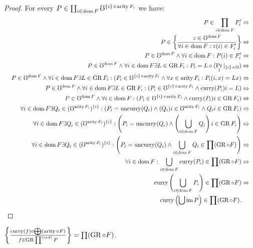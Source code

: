 \begin{proof}
For every $P\in\coprod_{i\in\operatorname{dom} F}\mho^{\{i\}\times\operatorname{arity} F_{i}}$
we have:
\[
\resizebox{\hsize}{!}{
$\begin{aligned}
P\in\prod_{i\in\dom F}F'_{i} & \Leftrightarrow\\
P\in\setcond{z\in\mho^{\dom F}}{\forall i\in\dom F:z(i)\in F'_{i}} & \Leftrightarrow\\
P\in\mho^{\dom F}\land\forall i\in\dom F:P(i)\in F'_{i} & \Leftrightarrow\\
P\in\mho^{\dom F}\land\forall i\in\dom F\exists L\in\GR F_{i}:P_{i}=L\circ(\Pr_{1}|_{\{i\}\times\mho}) & \Leftrightarrow\\
P\in\mho^{\dom F}\land\forall i\in\dom F\exists L\in\GR F_{i}:(P_{i}\in\mho^{\{i\}\times\arity F_{i}}\land\forall x\in\arity F_{i}:P_{i}(i,x)=Lx) & \Leftrightarrow\\
P\in\mho^{\dom F}\land\forall i\in\dom F\exists L\in\GR F_{i}:(P_{i}\in\mho^{\{i\}\times\arity F_{i}}\land\curry(P_{i})i=L) & \Leftrightarrow\\
P\in\mho^{\dom F}\land\forall i\in\dom F:(P_{i}\in\mho^{\{i\}\times\arity F_{i}}\land\curry(P_{i})i\in\GR F_{i}) & \Leftrightarrow\\
\forall i\in\dom F\exists Q_{i}\in(\mho^{\arity F_{i}})^{\{i\}}:(P_{i}=\uncurry(Q_{i})\land(Q_{i})i\in\mho^{\arity F_{i}}\land Q_{i}i\in\GR F_{i}) & \Leftrightarrow\\
\forall i\in\dom F\exists Q_{i}\in(\mho^{\arity F_{i}})^{\{i\}}:\left(P_{i}=\uncurry(Q_{i})\land\left(\bigcup_{i\in\dom F}Q_{i}\right)i\in\GR F_{i}\right) & \Leftrightarrow\\
\forall i\in\dom F\exists Q_{i}\in(\mho^{\arity F_{i}})^{\{i\}}:\left(P_{i}=\uncurry(Q_{i})\land\bigcup_{i\in\dom F}Q_{i}\in\prod(\GR\circ F)\right) & \Leftrightarrow\\
\forall i\in\dom F:\bigcup_{i\in\dom F}\curry(P_{i})\in\prod(\GR\circ F) & \Leftrightarrow\\
\curry\left(\bigcup_{i\in\dom F}P_{i}\right)\in\prod(\GR\circ F) & \Leftrightarrow\\
\curry\left(\bigcup\im P\right)\in\prod(\GR\circ F).
\end{aligned}$
}
\]
\end{proof}
\begin{lem}
$\left\{ \frac{\operatorname{curry}(f)\circ\bigoplus(\operatorname{arity}\circ F)}{f\in\operatorname{GR}\prod^{\mathrm{(ord)}}F}\right\}=\prod(\operatorname{GR}\circ F)$.\end{lem}
